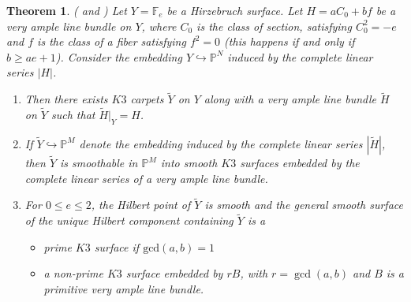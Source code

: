 \documentclass[11pt,twoside]{amsart}
\theoremstyle{plain}
\numberwithin{equation}{section}
\newtheorem{theorem}{Theorem}[section]
\theoremstyle{definition}
\begin{document}
\begin{theorem}\label{degeneration into $K3$ carpets}(\cite[Theorem $4.1$]{BMR21} and \cite[Theorem $2.9$]{GP97})
Let $Y = \mathbb{F}_e$ be a Hirzebruch surface. Let $H = aC_0+bf$ be a very ample line bundle on $Y$, where $C_0$ is the class of section, satisfying $C_0^2 = -e$ and $f$ is the class of a fiber satisfying $f^2 = 0$ (this happens if and only if $b \geq ae+1$). Consider the embedding $Y \hookrightarrow \mathbb{P}^N$ induced by the complete linear series $|H|$.  
\begin{enumerate}
    \item Then there exists $K3$ carpets $\widetilde{Y}$ on $Y$ along with a very ample line bundle $\widetilde{H}$ on $\widetilde{Y}$ such that $\widetilde{H}|_Y = H$.

    \item If $\widetilde{Y} \hookrightarrow \mathbb{P}^M$ denote the embedding induced by the complete linear series $|\widetilde{H}|$, then $\widetilde{Y}$ is smoothable in $\mathbb{P}^M$ into smooth $K3$ surfaces embedded by the complete linear series of a very ample line bundle.

    \item For $0 \leq e \leq 2$, the Hilbert point of $\widetilde{Y}$ is smooth and the general smooth surface of the unique Hilbert component containing $\widetilde{Y}$ is a 
    \begin{itemize}
        \item[(a)] prime $K3$ surface if $\textrm{gcd}(a,b) = 1$ 
        \item[(b)] a non-prime $K3$ surface embedded by $rB$, with $r = \operatorname{gcd}(a,b)$ and $B$ is a primitive very ample line bundle. 
    \end{itemize}
\end{enumerate}
\end{theorem}
\end{document}

